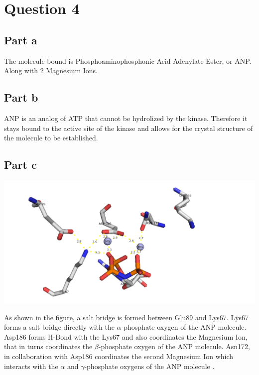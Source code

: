 \documentclass[11pt, a4paper,titlepage]{article}
\begin{document}
\section*{Question 4}
\subsection*{Part a}

The molecule bound is Phosphoaminophosphonic Acid-Adenylate Ester, or
ANP. Along with 2 Magnesium Ions.

\subsection*{Part b}

ANP is an analog of ATP that cannot be hydrolized by the
kinase. Therefore it stays bound to the active site of the kinase and
allows for the crystal structure of the molecule to be established.

\subsection*{Part c}

\includegraphics[width=15cm]{./Figures/4c.png}

As shown in the figure, a salt bridge is formed between Glu89 and
Lys67.  Lys67 forms a salt bridge directly with the $\alpha$-phosphate
oxygen of the ANP molecule. Asp186 forms H-Bond with the Lys67 and
also coordinates the Magnesium Ion, that in turns coordinates the
$\beta$-phosphate oxygen of the ANP molecule. Asn172, in collaboration
with Asp186 coordinates the second Magnesium Ion which interacts with
the $\alpha$ and $\gamma$-phosphate oxygens of the ANP molecule
\cite{CSPim1Kinase}.
\end{document}
